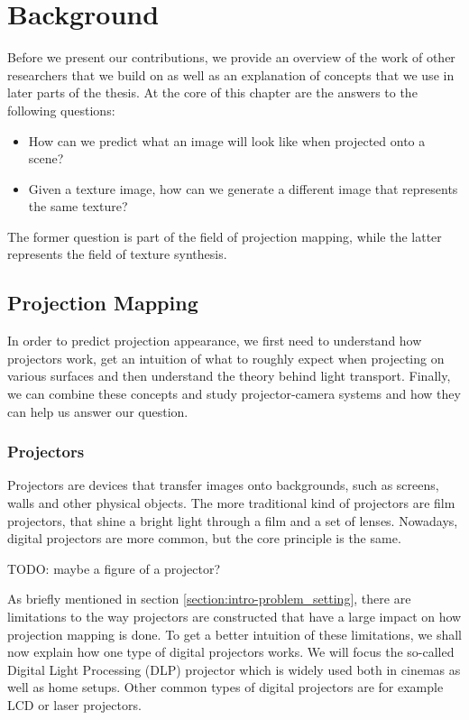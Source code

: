 \chapter{Background}
\label{chapter:background} 


Before we present our contributions, we provide an overview of the work of other researchers that we build on as well as an explanation of concepts that we use in later parts of the thesis. At the core of this chapter are the answers to the following questions:

\begin{itemize}
    \item How can we predict what an image will look like when projected onto a scene?
    \item Given a texture image, how can we generate a different image that represents the same texture?
\end{itemize}

The former question is part of the field of projection mapping, while the latter represents the field of texture synthesis.

\section{Projection Mapping}
\label{section:background-projection_mapping}

In order to predict projection appearance, we first need to understand how projectors work, get an intuition of what to roughly expect when projecting on various surfaces and then understand the theory behind light transport. Finally, we can combine these concepts and study projector-camera systems and how they can help us answer our question.

\subsection{Projectors}
\label{section:background-projection_mapping-projectors}

Projectors are devices that transfer images onto backgrounds, such as screens, walls and other physical objects. The more traditional kind of projectors are film projectors, that shine a bright light through a film and a set of lenses. Nowadays, digital projectors are more common, but the core principle is the same.

{\color{red} TODO: maybe a figure of a projector?}

As briefly mentioned in section \ref{section:intro-problem_setting}, there are limitations to the way projectors are constructed that have a large impact on how projection mapping is done. To get a better intuition of these limitations, we shall now explain how one type of digital projectors works. We will focus the so-called Digital Light Processing (DLP) projector which is widely used both in cinemas as well as home setups. Other common types of digital projectors are for example LCD or laser projectors.

